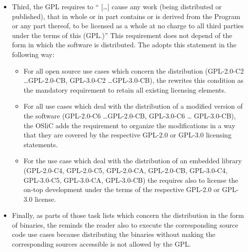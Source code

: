 \begin{itemize}
\item Third, the GPL requires to \enquote{ [\ldots] cause any work (being
  distributed or published), that in whole or in part contains or is derived
  from the Program or any part thereof, to be licensed as a whole at no charge
  to all third parties under the terms of this (GPL.)}
  This requirement does not depend of the form in which the software is
  distributed. The \oslic{} adopts this statement in the following way:
  \begin{itemize}
  \item For all open source use cases which concern the distribution (GPL-2.0-C2
    \ldots GPL-2.0-CB, GPL-3.0-C2 \ldots GPL-3.0-CB), the \oslic{} rewrites this
    condition as the mandatory requirement to retain all existing licensing
    elements.
      
  \item For all use cases which deal with the distribution of a modified version
    of the software (GPL-2.0-C6 \ldots GPL-2.0-CB, GPL-3.0-C6 \ldots
    GPL-3.0-CB), the OSliC adds the requirement to organize the modifications in
    a way that they are covered by the respective GPL-2.0 or GPL-3.0 licensing
    statements.
      
  \item For the use case which deal with the distribution of an embedded library
    (GPL-2.0-C4, GPL-2.0-C5, GPL-2.0-CA, GPL-2.0-CB, GPL-3.0-C4, GPL-3.0-C5,
    GPL-3.0-CA, GPL-3.0-CB) the \oslic{} requires also to license the on-top
    development under the terms of the respective GPL-2.0 or GPL-3.0 license.
    \end{itemize}
   
\item Finally, as parts of those task lists which concern the distribution in
  the form of binaries, the \oslic{} reminds the reader also to execute the
  corresponding source code use cases because distributing the binaries without
  making the corresponding sources accessible is not allowed by the GPL.
\end{itemize}
  
%


